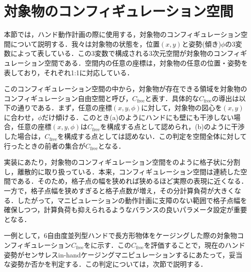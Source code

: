 \documentclass[a4paper,twoside,12pt,papersize, dvipdfmx]{iirthesis}
\begin{document}
\section{対象物のコンフィギュレーション空間\cite{komiyama2021}}\label{sec::sicm::cspace}
本節では，ハンド動作計画の際に使用する，対象物のコンフィギュレーション空間について説明する．我々は対象物の状態を，位置$(x, y)$と姿勢(傾き)$\phi$の3変数によって表している．この3変数で構成される3次元空間が対象物のコンフィギュレーション空間である．空間内の任意の座標は，対象物の任意の位置・姿勢を表しており，それぞれ1:1に対応している．\par

このコンフィギュレーション空間の中から，対象物が存在できる領域を対象物のコンフィギュレーション自由空間と呼び，$C_{\mathrm{free}}$と表す．具体的な$C_{\mathrm{free}}$の導出は以下の通りである．まず，任意の座標$(x, y, \phi)$に対して，対象物の図心を$(x, y)$に合わせ，$\phi$だけ傾ける．このとき(a)のようにハンドにも壁にも干渉しない場合，任意の座標$(x, y, \phi)$は$C_{\mathrm{free}}$を構成する点として認められ，(b)のように干渉した場合は，$C_{\mathrm{free}}$を構成する点としては認めない．この判定を空間全体に対して行ったときの前者の集合が$C_{\mathrm{free}}$となる．\par

実装にあたり，対象物のコンフィギュレーション空間をのように格子状に分割し，離散的に取り扱っている．本来，コンフィギュレーション空間は連続した空間である．そのため，格子点の幅を狭めれば狭めるほど実際の表現に近くなる．一方で，格子点幅を狭めすぎると格子点数が増え，その分計算負荷が大きくなる．したがって，マニピュレーションの動作計画に支障のない範囲で格子点幅を確保しつつ，計算負荷も抑えられるようなバランスの良いパラメータ設定が重要となる．\par

一例として，6自由度並列型ハンドで長方形物体をケージングした際の対象物コンフィギュレーション$C_{\mathrm{free}}$をに示す．この$C_{\mathrm{free}}$を評価することで，現在のハンド姿勢がセンサレスin-handケージングマニピュレーションするにあたって，妥当な姿勢か否かを判定する．この判定については，次節で説明する．
\end{document}
